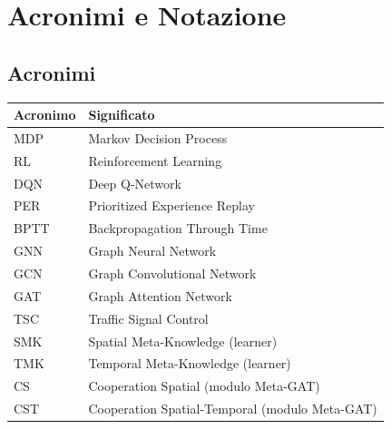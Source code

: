 \chapter*{Acronimi e Notazione}

\section*{Acronimi}
\begin{table}[ht]
\centering
\small
\begin{tabular}{@{}ll@{}}
\toprule
Acronimo & Significato \\
\midrule
MDP & Markov Decision Process \\
RL & Reinforcement Learning \\
DQN & Deep Q-Network \\
PER & Prioritized Experience Replay \\
BPTT & Backpropagation Through Time \\
GNN & Graph Neural Network \\
GCN & Graph Convolutional Network \\
GAT & Graph Attention Network \\
TSC & Traffic Signal Control \\
SMK & Spatial Meta-Knowledge (learner) \\
TMK & Temporal Meta-Knowledge (learner) \\
CS & Cooperation Spatial (modulo Meta-GAT) \\
CST & Cooperation Spatial-Temporal (modulo Meta-GAT) \\
\bottomrule
\end{tabular}
\end{table}

\newpage
